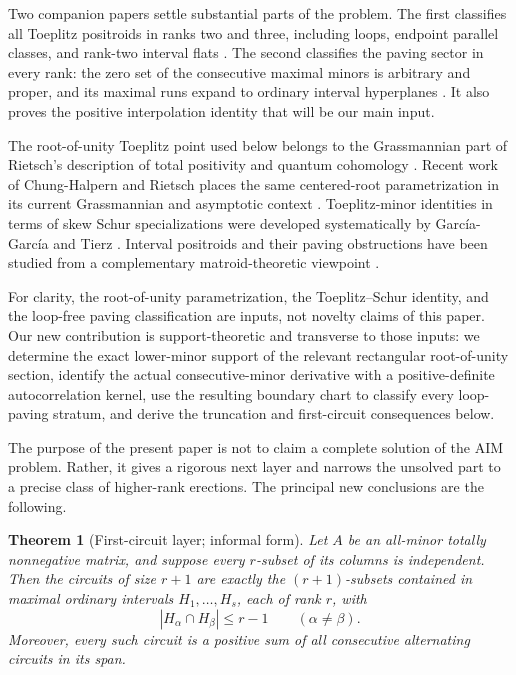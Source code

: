 \documentclass[11pt]{amsart}
\newtheorem{theorem}{Theorem}[section]
\theoremstyle{definition}
\theoremstyle{remark}
\begin{document}
Two companion papers settle substantial parts of the problem.  The first classifies all Toeplitz positroids in ranks two and three, including loops, endpoint parallel classes, and rank-two interval flats \cite{CGQlow}.  The second classifies the paving sector in every rank: the zero set of the consecutive maximal minors is arbitrary and proper, and its maximal runs expand to ordinary interval hyperplanes \cite{CGQpaving}.  It also proves the positive interpolation identity that will be our main input.

The root-of-unity Toeplitz point used below belongs to the Grassmannian part of Rietsch's description of total positivity and quantum cohomology \cite{RietschGrassmannian,Rietsch}.  Recent work of Chung-Halpern and Rietsch places the same centered-root parametrization in its current Grassmannian and asymptotic context \cite{ChungHalpernRietsch}.  Toeplitz-minor identities in terms of skew Schur specializations were developed systematically by Garc\'ia-Garc\'ia and Tierz \cite{GarciaTierz}.  Interval positroids and their paving obstructions have been studied from a complementary matroid-theoretic viewpoint \cite{Knutson,Park}.

For clarity, the root-of-unity parametrization, the Toeplitz--Schur identity, and the loop-free paving classification are inputs, not novelty claims of this paper.  Our new contribution is support-theoretic and transverse to those inputs: we determine the exact lower-minor support of the relevant rectangular root-of-unity section, identify the actual consecutive-minor derivative with a positive-definite autocorrelation kernel, use the resulting boundary chart to classify every loop-paving stratum, and derive the truncation and first-circuit consequences below.

The purpose of the present paper is not to claim a complete solution of the AIM problem.  Rather, it gives a rigorous next layer and narrows the unsolved part to a precise class of higher-rank erections.  The principal new conclusions are the following.

\begin{theorem}[First-circuit layer; informal form]\label{thm:intro-first-circuit}
Let $A$ be an all-minor totally nonnegative matrix, and suppose every $r$-subset of its columns is independent.  Then the circuits of size $r+1$ are exactly the $(r+1)$-subsets contained in maximal ordinary intervals $H_1,\ldots,H_s$, each of rank $r$, with
\[
 |H_\alpha\cap H_\beta|\le r-1\qquad(\alpha\ne\beta).
\]
Moreover, every such circuit is a positive sum of all consecutive alternating circuits in its span.
\end{theorem}
\end{document}
